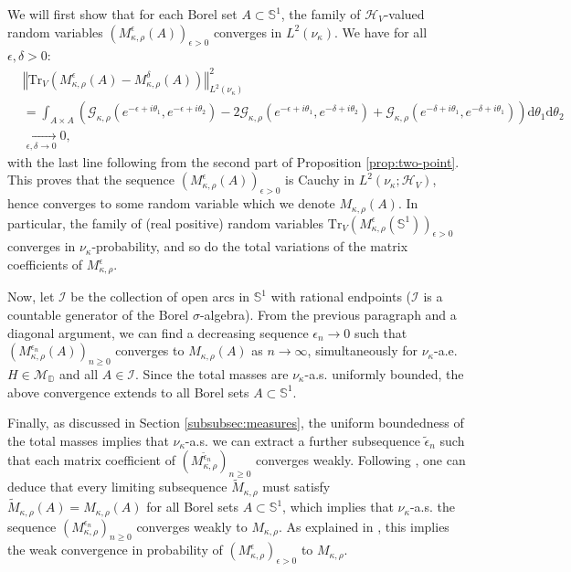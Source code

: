 \documentclass[12pt,a4paper]{amsart}
\numberwithin{equation}{section}
\theoremstyle{remark}
\theoremstyle{definition}
\renewcommand{\S}{\mathbb S}
\newcommand{\D}{\mathbb D}
\renewcommand{\d}{\mathrm d}
\newcommand{\cM}{\mathcal M}
\newcommand{\cH}{\mathcal{H}}
\newcommand{\cG}{\mathcal{G}}
\begin{document}
 We will first show that for each Borel set $A\subset\S^1$, the family of $\cH_V$-valued random variables $(M^\epsilon_{\kappa,\rho}(A))_{\epsilon>0}$ converges in $L^2(\nu_\kappa)$. We have for all $\epsilon,\delta>0$:
\begin{equation}\label{eq:second-moment}
\begin{aligned}
&\left\Vert\mathrm{Tr}_V(M^\epsilon_{\kappa,\rho}(A)-M^\delta_{\kappa,\rho}(A))\right\Vert_{L^2(\nu_\kappa)}^2\\
     &=\int_{A\times A}\left(\cG_{\kappa,\rho}(e^{-\epsilon+i\theta_1},e^{-\epsilon+i\theta_2})-2\cG_{\kappa,\rho}(e^{-\epsilon+i\theta_1},e^{-\delta+i\theta_2})+\cG_{\kappa,\rho}(e^{-\delta+i\theta_1},e^{-\delta+i\theta_1})\right)\d\theta_1\d\theta_2\\
    &\underset{\epsilon,\delta\to0}{\to}0,
\end{aligned}
\end{equation}
with the last line following from the second part of Proposition \ref{prop:two-point}. This proves that the sequence $(M^\epsilon_{\kappa,\rho}(A))_{\epsilon>0}$ is Cauchy in $L^2(\nu_\kappa;\cH_V)$, hence converges to some random variable which we denote $M_{\kappa,\rho}(A)$. In particular, the family of (real positive) random variables $\mathrm{Tr}_V(M^\epsilon_{\kappa,\rho}(\S^1))_{\epsilon>0}$ converges in $\nu_\kappa$-probability, and so do the total variations of the matrix coefficients of $M^\epsilon_{\kappa,\rho}$. 

 Now, let $\mathcal{I}$ be the collection of open arcs in $\S^1$ with rational endpoints ($\mathcal I$ is a countable generator of the Borel $\sigma$-algebra). From the previous paragraph and a diagonal argument, we can find a decreasing sequence $\epsilon_n\to0$ such that $(M^{\epsilon_n}_{\kappa,\rho}(A))_{n\geq0}$ converges to $M_{\kappa,\rho}(A)$ as $n\to\infty$, simultaneously for $\nu_\kappa$-a.e. $H\in\cM_\D$ and all $A\in\mathcal{I}$. Since the total masses are $\nu_\kappa$-a.s. uniformly bounded, the above convergence extends to all Borel sets $A\subset\S^1$.

Finally, as discussed in Section \ref{subsubsec:measures}, the uniform boundedness of the total masses implies that $\nu_\kappa$-a.s. we can extract a further subsequence $\tilde\epsilon_n$ such that each matrix coefficient of $(M^{\tilde\epsilon_n}_{\kappa,\rho})_{n\geq0}$ converges weakly. Following \cite[Section 6]{Berestycki}, one can deduce that every limiting subsequence $\tilde M_{\kappa,\rho}$ must satisfy $\tilde M_{\kappa,\rho}(A)=M_{\kappa,\rho}(A)$ for all Borel sets $A\subset\S^1$, which implies that $\nu_\kappa$-a.s. the sequence $(M^{\epsilon_n}_{\kappa,\rho})_{n\geq0}$ converges weakly to $M_{\kappa,\rho}$. As explained in \cite[Section 6]{Berestycki}, this implies the weak convergence in probability of $(M^\epsilon_{\kappa,\rho})_{\epsilon>0}$ to $M_{\kappa,\rho}$.
\end{document}

